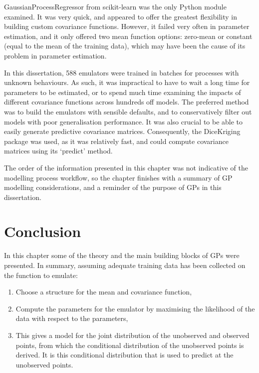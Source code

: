 \documentclass[
  12pt,
  a4paper,
  twoside]{book}
\providecommand{\tightlist}{%
  \setlength{\itemsep}{0pt}\setlength{\parskip}{0pt}}
\begin{document}
GaussianProcessRegressor from scikit-learn was the only Python module examined. It was very quick, and appeared to offer the greatest flexibility in building custom covariance functions. However, it failed very often in parameter estimation, and it only offered two mean function options: zero-mean or constant (equal to the mean of the training data), which may have been the cause of its problem in parameter estimation.

In this dissertation, 588 emulators were trained in batches for processes with unknown behaviours. As such, it was impractical to have to wait a long time for parameters to be estimated, or to spend much time examining the impacts of different covariance functions across hundreds off models. The preferred method was to build the emulators with sensible defaults, and to conservatively filter out models with poor generalisation performance. It was also crucial to be able to easily generate predictive covariance matrices. Consequently, the DiceKriging package was used, as it was relatively fast, and could compute covariance matrices using its `predict' method.

The order of the information presented in this chapter was not indicative of the modelling process workflow, so the chapter finishes with a summary of GP modelling considerations, and a reminder of the purpose of GPs in this dissertation.

\hypertarget{conclusion-2}{%
\section{Conclusion}\label{conclusion-2}}

In this chapter some of the theory and the main building blocks of GPs were presented. In summary, assuming adequate training data has been collected on the function to emulate:

\begin{enumerate}
\def\labelenumi{\arabic{enumi}.}
\tightlist
\item
  Choose a structure for the mean and covariance function,
\item
  Compute the parameters for the emulator by maximising the likelihood of the data with respect to the parameters,
\item
  This gives a model for the joint distribution of the unobserved and observed points, from which the conditional distribution of the unobserved points is derived. It is this conditional distribution that is used to predict at the unobserved points.
\end{enumerate}
\end{document}
